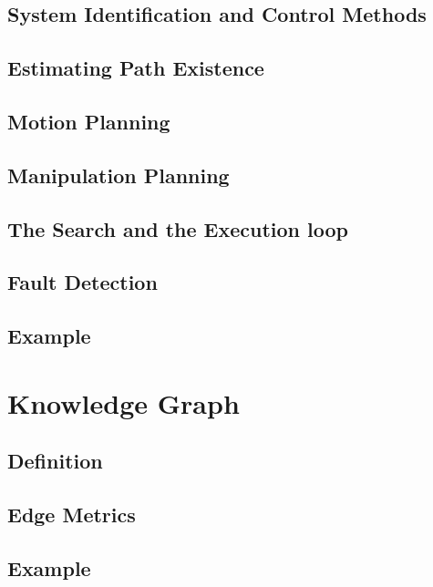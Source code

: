 \subsection{System Identification and Control Methods}
\label{subsec: sys_iden_and_control_methods}

\subsection{Estimating Path Existence}
\label{subsec: estimating_path_existence}
\subsection{Motion Planning}
\label{subsec: motion_planning}
\subsection{Manipulation Planning}
\label{subsec: manipulation_planning}
\subsection{The Search and the Execution loop}
\label{subsec: 2_loops}
\subsection{Fault Detection}
\label{subsec: fault_detection}
\subsection{Example}
\label{subsec: hgraph_example}

\section{Knowledge Graph}
\subsection{Definition}
\label{subsec: kgraph_definition}
\subsection{Edge Metrics}
\label{subsec: edge_metrics}
\subsection{Example}
\label{subsec: kgraph_example}
